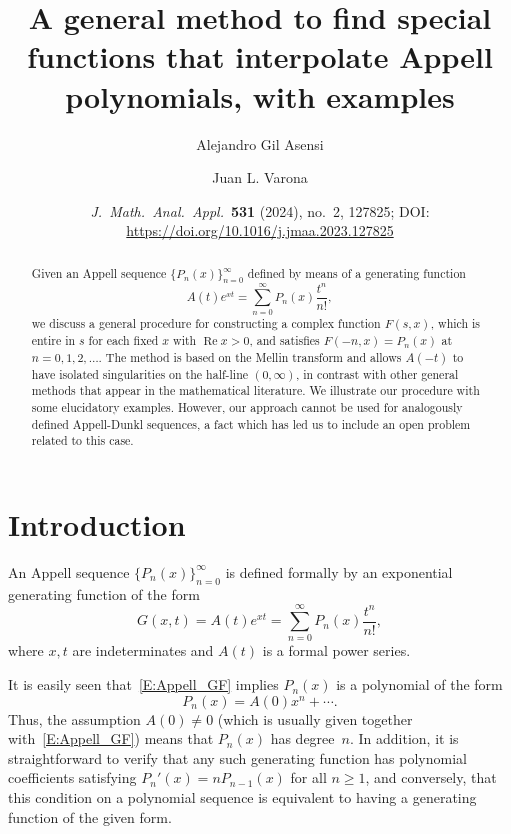 \documentclass[11pt,a4paper]{amsart}
\title[Special functions that interpolate Appell polynomials]%
{A general method to find special functions that interpolate Appell polynomials, 
with examples}
\author[A. Gil Asensi]{Alejandro Gil Asensi}
\author[J.~L.~Varona]{Juan L. Varona}
\date{\textit{J.\ Math.\ Anal.\ Appl.}\ \textbf{531} (2024), no.~2, 127825; 
DOI: \url{https://doi.org/10.1016/j.jmaa.2023.127825}}
\theoremstyle{plain}
\theoremstyle{plain}
\theoremstyle{remark}
\numberwithin{equation}{section}
\begin{document}

\begin{abstract}
Given an Appell sequence $\{P_n(x)\}_{n=0}^\infty$ defined by means of a generating function
\[
A(t) e^{xt} = \sum_{n=0}^\infty P_{n}(x)\frac{t^n}{n!},
\]
we discuss a general procedure for constructing a complex function $F(s,x)$, which is entire in $s$ for each fixed $x$ with $\operatorname{Re}x > 0$, and satisfies $F(-n,x) = P_n(x)$ at $n = 0,1,2,\dots$. The method is based on the Mellin transform and allows $A(-t)$ to have isolated singularities on the half-line $(0,\infty)$, in contrast with other general methods that appear in the mathematical literature. We illustrate our procedure with  some elucidatory examples. However, our approach cannot be used for analogously defined Appell-Dunkl sequences, a fact which has led us to include an open problem related to this case.
\end{abstract}

\maketitle

\section{Introduction} 

An Appell sequence $\{P_{n}(x)\}_{n=0}^{\infty}$ is defined formally by an exponential generating function of the form
\begin{equation}
\label{E:Appell_GF}
  G(x,t) = A(t) e^{xt} = \sum_{n=0}^\infty P_{n}(x)\frac{t^n}{n!},
\end{equation}
where $x,t$ are indeterminates and $A(t)$ is a formal power series.

It is easily seen that~\eqref{E:Appell_GF} implies $P_{n}(x)$ is a polynomial of the form
\begin{equation*}
  P_{n}(x) = A(0)x^n+\cdots.
\end{equation*}
Thus, the assumption $A(0) \neq 0$ (which is usually given together with~\eqref{E:Appell_GF}) means that $P_{n}(x)$ has degree~$n$.
In addition, it is straightforward to verify that any such generating function has polynomial coefficients satisfying $P_{n}'(x) = n P_{n-1}(x)$ for all $n \geq 1$, and conversely, that this condition on a polynomial sequence is equivalent to having a generating function of the given form. 
 
\end{document}
